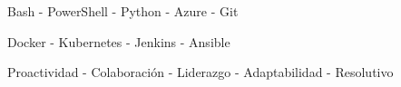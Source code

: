 
Bash - PowerShell - Python - Azure - Git

Docker - Kubernetes - Jenkins - Ansible

Proactividad - Colaboración - Liderazgo - Adaptabilidad - Resolutivo

